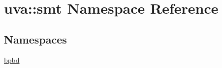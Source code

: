 \hypertarget{namespaceuva_1_1smt}{}\section{uva\+:\+:smt Namespace Reference}
\label{namespaceuva_1_1smt}
\subsection*{Namespaces}
\begin{DoxyCompactItemize}
\item 
 \hyperlink{namespaceuva_1_1smt_1_1bpbd}{bpbd}
\end{DoxyCompactItemize}
